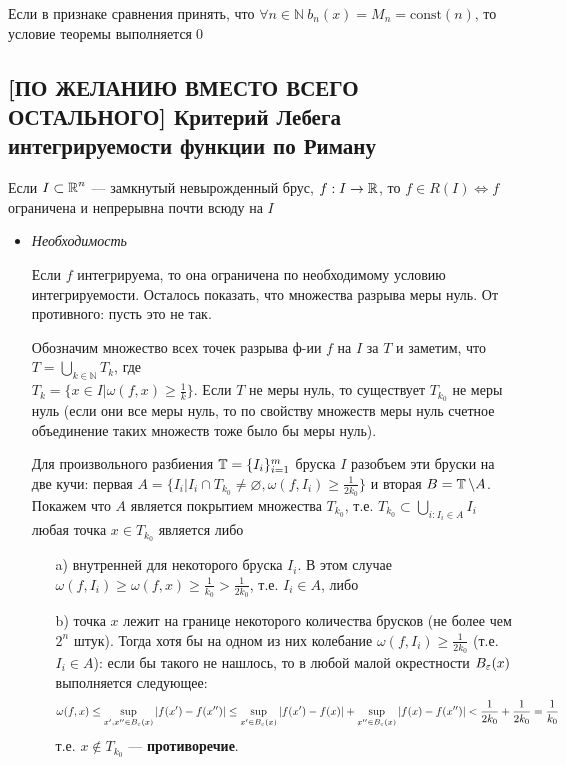 \documentclass[a4paper]{article}
\begin{document}
\proof Если в признаке сравнения принять, что $\forall n\in \mathbb{N}\ b_n(x)=M_n=\text{const}(n)$, то условие теоремы выполняется\qed 


\subsection{[ПО ЖЕЛАНИЮ ВМЕСТО ВСЕГО ОСТАЛЬНОГО] Критерий Лебега интегрируемости функции по Риману}
\theorem Если $I\subset \operatorname{\mathbb{R}}^n$ — замкнутый невырожденный брус, $f: I\to\operatorname{\mathbb{R}}$, то $f\in R(I) \iff f$ ограничена и непрерывна почти всюду на $I$

\proof 
\begin{itemize}
    \item \textit{Необходимость}
    
     Если $f$ интегрируема, то она ограничена по необходимому условию интегрируемости. Осталось показать, что множества разрыва меры нуль. От противного: пусть это не так.

    Обозначим множество всех точек разрыва ф-ии $f$ на $I$ за $T$ и заметим, что $T = \displaystyle\bigcup_{k\in\mathbb{N}}T_k$, где\\
    $T_k = \{x\in I | \omega(f, x) \ge \frac{1}{k}\}$. Если $T$ не меры нуль, то существует $T_{k_0}$ не меры нуль (если они все меры нуль, то по свойству множеств меры нуль счетное объединение таких множеств тоже было бы меры нуль).

    Для произвольного разбиения $\operatorname{\mathbb{T}} = \{I_i\}_{i=1}^m$ бруска $I$ разобъем эти бруски на две кучи: первая $A = \{I_i | I_i\cap T_{k_0} \ne \varnothing, \omega(f, I_i) \ge \frac{1}{2k_0}\}$ и вторая $B = \operatorname{\mathbb{T}}\backslash A$. Покажем что $A$ является покрытием множества $T_{k_0}$, т.е. $T_{k_0} \subset \displaystyle\bigcup_{i: I_i\in A} I_i$ любая точка $x\in T_{k_0}$ является либо
    \begin{itemize}
        \item[a)] внутренней для некоторого бруска $I_i$. В этом случае $\omega(f, I_i) \ge \omega(f, x) \ge \frac{1}{k_0} > \frac{1}{2k_0}$, т.е. $I_i \in A$, либо
        \item[b)] точка $x$ лежит на границе некоторого количества брусков (не более чем $2^n$ штук). Тогда хотя бы на одном из них колебание $\omega(f, I_i) \ge \frac{1}{2k_0}$ (т.е. $I_i \in A$): если бы такого не нашлось, то в любой малой окрестности $B_{\operatorname{\varepsilon}}(x)$ выполняется следующее:
        \begin{equation*}
            \omega(f, x) \le \sup_{x', x''\in B_{\operatorname{\varepsilon}}(x)} |f(x')-f(x'')| \le \sup_{x'\in B_{\operatorname{\varepsilon}}(x)}|f(x')-f(x)| + \sup_{x''\in B_{\operatorname{\varepsilon}}(x)}|f(x)-f(x'')| < \frac{1}{2k_0} + \frac{1}{2k_0} = \frac{1}{k_0}
        \end{equation*}
        т.е. $x\not\in T_{k_0}$ --- \textbf{противоречие}.
    \end{itemize}


\end{itemize}
\end{document}
